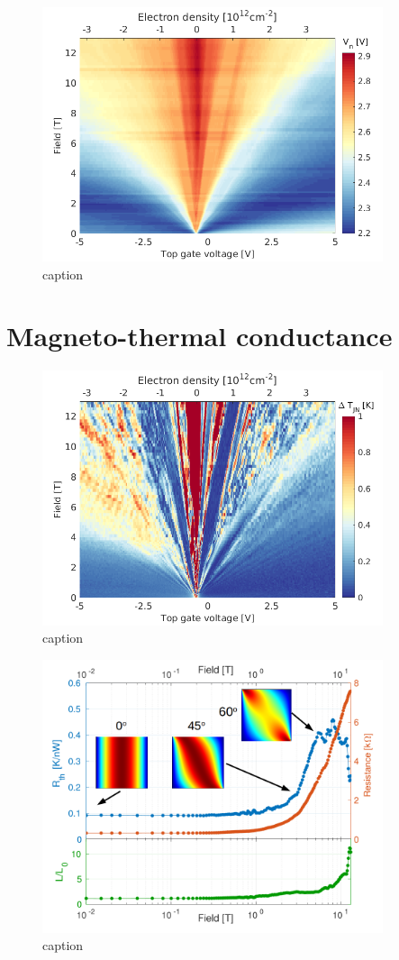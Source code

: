 \begin{figure}
\centering
\includegraphics[width=100mm]{figures/magneto/Fan_VNdc.png}
\caption{caption}
\label{fig:m_VNdc}
\end{figure}

\section{Magneto-thermal conductance}

\begin{figure}
\centering
\includegraphics[width=100mm]{figures/magneto/Fan_DT.png}
\caption{caption}
\label{fig:m_DT}
\end{figure}

\begin{figure}
\centering
\includegraphics[width=100mm]{figures/magneto/High_density.png}
\caption{caption}
\label{fig:m_high_density}
\end{figure}

